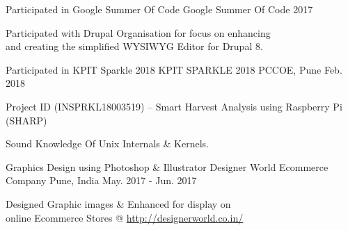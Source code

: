 \vspace{-8pt}


\begin{cventries}


\cventry
{Participated in Google Summer Of Code} %
{Google Summer Of Code 2017} %
{} %
{} %
{ %
	\begin{cvitems}
		\item {Participated with Drupal Organisation for focus on enhancing\\ and creating the simplified WYSIWYG Editor for Drupal 8.}
	\end{cvitems}
}


\vspace{-10pt}

\cventry
{Participated in KPIT Sparkle 2018} %
{KPIT SPARKLE 2018} %
{PCCOE, Pune} %
{Feb. 2018} %
{ %
	\begin{cvitems}
		\item {Project ID (INSPRKL18003519) -- Smart Harvest Analysis using Raspberry Pi (SHARP)}
	\end{cvitems}
}

\vspace{-10pt}


\cventry
{} %
{Sound Knowledge Of Unix Internals \& Kernels.} %
{} %
{} %
{ %
	\begin{cvitems}
	\end{cvitems}
}

\vspace{-30pt}

\cventry
{Graphics Design using Photoshop \& Illustrator} %
{Designer World Ecommerce Company} %
{Pune, India} %
{May. 2017 - Jun. 2017} %
{ %
	\begin{cvitems}
		\item {Designed Graphic images \& Enhanced for display on\\
online Ecommerce Stores @ \url{http://designerworld.co.in/}}
	\end{cvitems}
}

\end{cventries}